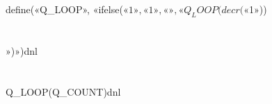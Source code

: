 define(«Q_LOOP», «ifelse(«$1», «1», «», «Q_LOOP(decr(«$1»))
\newpage
\section{} %

\ans

»)»)dnl
\section{} %

\ans

Q_LOOP(Q_COUNT)dnl
